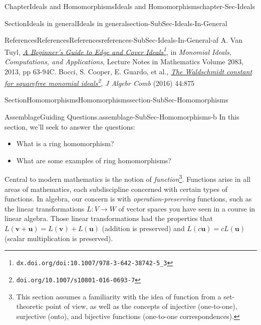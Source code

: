 \documentclass[oneside,10pt,]{book}
\numberwithin{equation}{section}
\begin{document}
\begin{chapterptx}{Chapter}{Ideals and Homomorphisms}{}{Ideals and Homomorphisms}{}{}{chapter-Sec-Ideals}
\begin{sectionptx}{Section}{Ideals in general}{}{Ideals in general}{}{}{section-SubSec-Ideals-In-General}
%
\begin{references-subsection-numberless}{References}{References}{}{References}{}{}{references-SubSec-Ideals-In-General-af}
A. Van Tuyl, \emph{\href{http://dx.doi.org/doi:10.1007/978-3-642-38742-5_3}{A Beginner's Guide to Edge and Cover Ideals}\footnote{\nolinkurl{dx.doi.org/doi:10.1007/978-3-642-38742-5_3}\label{fn-vantuyl-intro-a-b}}}, in \emph{Monomial Ideals, Computations, and Applications}, Lecture Notes in Mathematics Volume 2083, 2013, pp 63-94C. Bocci, S. Cooper, E. Guardo, et al., \emph{\href{https://doi.org/10.1007/s10801-016-0693-7}{The Waldschmidt constant for squarefree monomial ideals}\footnote{\nolinkurl{doi.org/10.1007/s10801-016-0693-7}\label{fn-mfo-waldschmidt-a-b}}}, \emph{J Algebr Comb} (2016) 44:875\end{references-subsection-numberless}
\end{sectionptx}
%
%
\typeout{************************************************}
\typeout{************************************************}
%
\begin{sectionptx}{Section}{Homomorphisms}{}{Homomorphisms}{}{}{section-SubSec-Homomorphisms}
\begin{assemblage}{Assemblage}{Guiding Questions.}{assemblage-SubSec-Homomorphisms-b}%
In this section, we'll seek to answer the questions: %
\begin{itemize}[label=\textbullet]
\item{}What is a ring homomorphism?%
\item{}What are some examples of ring homomorphisms?%
\end{itemize}
%
\end{assemblage}
\begin{introduction}{}%
Central to modern mathematics is the notion of \emph{function}\footnote{This section assumes a familiarity with the idea of function from a set-theoretic point of view, as well as the concepts of injective (one-to-one), surjective (onto), and bijective functions (one-to-one correspondences).\label{fn-SubSec-Homomorphisms-c-a-b}}. Functions arise in all areas of mathematics, each subdiscipline concerned with certain types of functions. In algebra, our concern is with \emph{operation-preserving} functions, such as the linear transformations \(L : V\to W\) of vector spaces you have seen in a course in linear algebra. Those linear transformations had the properties that \(L(\mathbf{v}+\mathbf{u}) = L(\mathbf{v})+L(\mathbf{u})\) (addition is preserved) and \(L(c\mathbf{u}) = c L(\mathbf{u})\) (scalar multiplication is preserved).%

\end{introduction}
\end{sectionptx}
\end{chapterptx}
\end{document}
